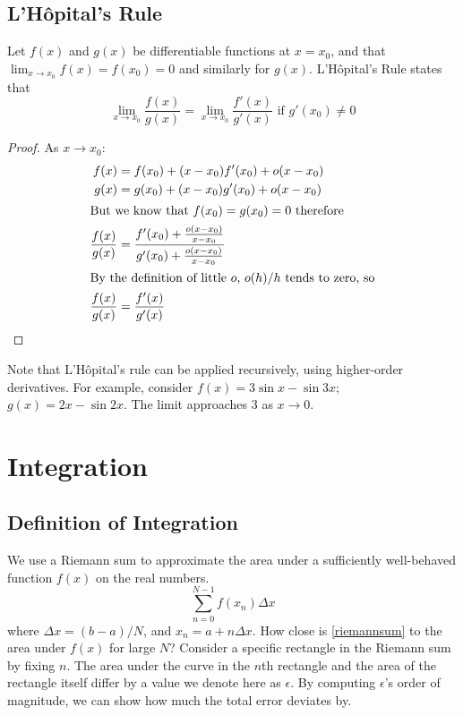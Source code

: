 \documentclass{article}
\begin{document}
\subsection{L'H\^opital's Rule}
Let $f(x)$ and $g(x)$ be differentiable functions at $x=x_0$, and that $\lim_{x\to x_0} f(x) = f(x_0) = 0$ and similarly for $g(x)$. L'H\^opital's Rule states that
\[ \lim_{x\to x_0} \frac{f(x)}{g(x)} = \lim_{x\to x_0} \frac{f'(x)}{g'(x)} \text{ if } g'(x_0) \neq 0 \]
\begin{proof}
    As $x \to x_0$:
    \begin{align*}
        f(x)              & = f(x_0) + (x-x_0) f'(x_0) + o(x-x_0)                                       \\
        g(x)              & = g(x_0) + (x-x_0) g'(x_0) + o(x-x_0)                                       \\
        \intertext{But we know that $f(x_0)=g(x_0)=0$ therefore}
        \frac{f(x)}{g(x)} & = \frac{f'(x_0) + \frac{o(x-x_0)}{x-x_0}}{g'(x_0) + \frac{o(x-x_0)}{x-x_0}} \\
        \intertext{By the definition of little $o$, $o(h)/h$ tends to zero, so}
        \frac{f(x)}{g(x)} & = \frac{f'(x)}{g'(x)}
    \end{align*}
\end{proof}
Note that L'H\^opital's rule can be applied recursively, using higher-order derivatives. For example, consider $f(x) = 3\sin x - \sin 3x$; $g(x) = 2x - \sin 2x$. The limit approaches 3 as $x \to 0$.

\section{Integration}
\subsection{Definition of Integration}
We use a Riemann sum to approximate the area under a sufficiently well-behaved function $f(x)$ on the real numbers.
\begin{equation}\label{riemannsum}
    \sum_{n=0}^{N-1} f(x_n) \Delta x
\end{equation}
where $\Delta x = (b-a)/N$, and $x_n = a + n\Delta x$. How close is \eqref{riemannsum} to the area under $f(x)$ for large $N$? Consider a specific rectangle in the Riemann sum by fixing $n$. The area under the curve in the $n$th rectangle and the area of the rectangle itself differ by a value we denote here as $\epsilon$. By computing $\epsilon$'s order of magnitude, we can show how much the total error deviates by.
\end{document}
